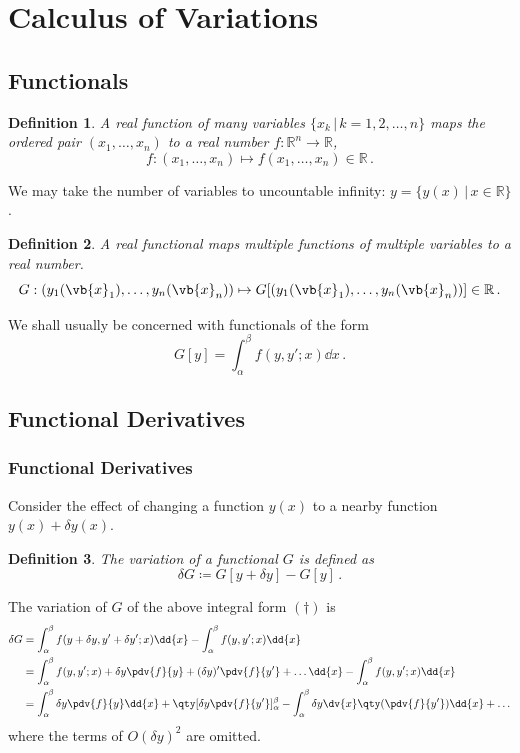 \documentclass{article}
\theoremstyle{plain}\theoremheaderfont{\normalfont\itshape}\theorembodyfont{\rmfamily}\theoremseparator{.}\newtheorem*{rem}{Remark}\newtheorem*{ex}{Example}\newtheorem*{proof}{Proof}\newtheorem*{altp}{Alternative proof}
\theoremstyle{plain}\theoremheaderfont{\normalfont\bfseries}\theorembodyfont{\rmfamily}\theoremseparator{.}\newtheorem{thm}{Theorem}[section]\newtheorem{lem}[thm]{Lemma}\newtheorem{prop}[thm]{Proposition}\newtheorem*{cor}{Corollary}\newtheorem{defn}[thm]{Definition}\newtheorem{clm}[thm]{Claim}\newtheorem{clminproof}{Claim}
\theoremstyle{break}\theoremheaderfont{\normalfont\itshape}\theorembodyfont{\rmfamily}\theoremseparator{.\medskip}\newtheorem*{proofskip}{Proof}\newtheorem*{exs}{Examples}\newtheorem*{rems}{Remarks}
\theoremstyle{break}\theoremheaderfont{\normalfont\bfseries}\theorembodyfont{\rmfamily}\theoremseparator{.\medskip}\newtheorem{lemskip}[thm]{Lemma}\newtheorem{defnskip}[thm]{Definition}\newtheorem{propskip}[thm]{Proposition}\newtheorem{thmskip}[thm]{Theorem}
\numberwithin{equation}{section}
\begin{document}
	\section{Calculus of Variations}
	\subsection{Functionals}
	\begin{defn}
		A real \textit{function} of many variables \(\{x_k\,|\,k=1,2,\dots,n\}\) maps the ordered pair \((x_1,\dots,x_n)\) to a real number \(f:\mathbb{R}^n\to\mathbb{R}\),
		\[f:(x_1,\dots,x_n)\mapsto f(x_1,\dots,x_n)\in\mathbb{R}\,.\]
	\end{defn}
	We may take the number of variables to uncountable infinity: \(y=\{y(x)\,|\,x\in\mathbb{R}\}\).
	\begin{defn}
		A real \textit{functional} maps multiple functions of multiple variables to a real number.
		\[G:(y_1(\vb{x}_1),\dots,y_n(\vb{x}_n))\mapsto G[(y_1(\vb{x}_1),\dots,y_n(\vb{x}_n))]\in\mathbb{R}\,.\]
	\end{defn}

	We shall usually be concerned with functionals of the form
	\begin{equation}\tag{\(\dagger\)}
		G[y]=\int_{\alpha}^{\beta}f(y,y';x)\dd{x}\,.
	\end{equation}
	\subsection{Functional Derivatives}
	\subsubsection{Functional Derivatives}
	Consider the effect of changing a function \(y(x)\) to a nearby function \(y(x)+\delta y(x)\).
	\begin{defn}
		The \textit{variation} of a functional \(G\) is defined as
		\[\delta G\coloneqq G[y+\delta y]-G[y]\,.\]
	\end{defn}

	The variation of \(G\) of the above integral form \((\dagger)\) is
	\begin{align*}
		\delta G&=\int_{\alpha}^{\beta}f(y+\delta y,y'+\delta y';x)\dd{x}-\int_{\alpha}^{\beta}f(y,y';x)\dd{x}\\
		&=\int_{\alpha}^{\beta}f(y,y';x)+\delta y\pdv{f}{y}+(\delta y)'\pdv{f}{y'}+\dots\dd{x}-\int_{\alpha}^{\beta}f(y,y';x)\dd{x}\\
		&=\int_{\alpha}^{\beta}\delta y\pdv{f}{y}\dd{x}+\qty[\delta y\pdv{f}{y'}]_\alpha^\beta-\int_{\alpha}^{\beta}\delta y\dv{x}\qty(\pdv{f}{y'})\dd{x}+\dots
	\end{align*}
	where the terms of \(O(\delta y)^2\) are omitted.
\end{document}
